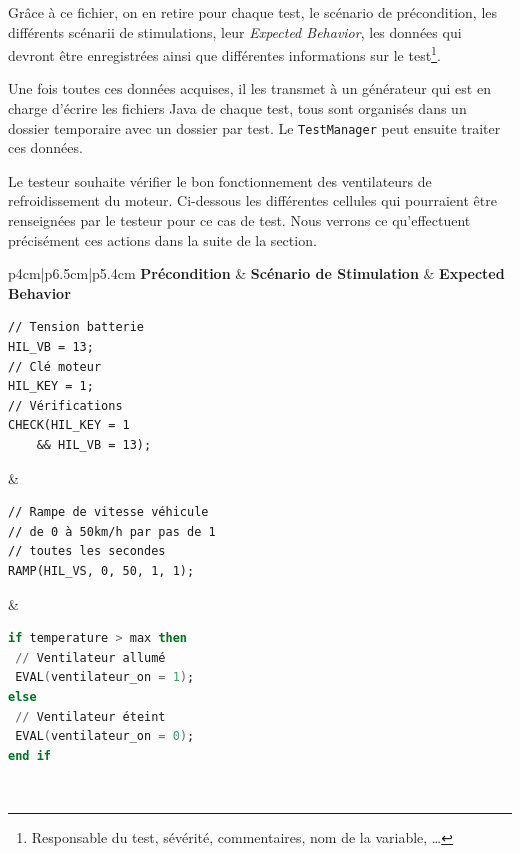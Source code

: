Grâce à ce fichier, on en retire pour chaque test, le scénario de précondition, les différents scénarii de stimulations, leur \textit{Expected Behavior}, les données qui devront être enregistrées ainsi que différentes informations sur le test\footnote{Responsable du test, sévérité, commentaires, nom de la variable, \ldots}.

Une fois toutes ces données acquises, il les transmet à un générateur qui est en charge d'écrire les fichiers Java de chaque test, tous sont organisés dans un dossier temporaire avec un dossier par test. Le \texttt{TestManager} peut ensuite traiter ces données.

\begin{exemple}
Le testeur souhaite vérifier le bon fonctionnement des ventilateurs de refroidissement du moteur. Ci-dessous les différentes cellules qui pourraient être renseignées par le testeur pour ce cas de test. Nous verrons ce qu'effectuent précisément ces actions dans la suite de la section.	

\begin{tabular}{p{4cm}|p{6.5cm}|p{5.4cm}}
	\textbf{Précondition} & \textbf{Scénario de Stimulation} & \textbf{Expected Behavior}\\
	\hline
	\begin{minipage}{0.1\linewidth}
		\begin{lstlisting}[framerule=0pt,language=gtl]
// Tension batterie
HIL_VB = 13;
// Clé moteur
HIL_KEY = 1;
// Vérifications
CHECK(HIL_KEY = 1 
	&& HIL_VB = 13);
	\end{lstlisting}
	\end{minipage} & 
	\begin{minipage}{0.1\linewidth}
		\begin{lstlisting}[framerule=0pt,language=gtl]
// Rampe de vitesse véhicule
// de 0 à 50km/h par pas de 1 
// toutes les secondes	
RAMP(HIL_VS, 0, 50, 1, 1);
		\end{lstlisting}
	\end{minipage} 
	&
		\begin{minipage}{0.1\linewidth}
			\begin{lstlisting}[language=ada,framerule=0pt,language=gtl]	
if temperature > max then
 // Ventilateur allumé
 EVAL(ventilateur_on = 1); 
else
 // Ventilateur éteint
 EVAL(ventilateur_on = 0); 
end if
			\end{lstlisting}
		\end{minipage} 
	\\
\end{tabular}
\end{exemple}

